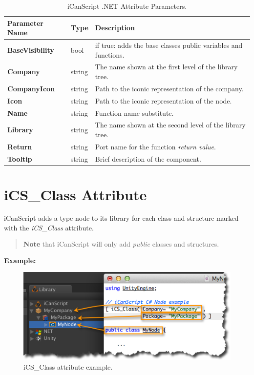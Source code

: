 \begin{table}[htbp]
\begin{minipage}{\linewidth}
\setlength{\tymax}{0.5\linewidth}
\centering
\small
\caption{iCanScript .NET Attribute Parameters.}
\label{icanscript.netattributeparameters.}
\begin{tabulary}{\textwidth}{@{}LLL@{}} \toprule
Parameter Name&Type&Description\\
\midrule
\textbf{BaseVisibility}&bool&if true: adds the base classes public variables and functions.\\
\textbf{Company}&string&The name shown at the first level of the library tree.\\
\textbf{CompanyIcon}&string&Path to the iconic representation of the company.\\
\textbf{Icon}&string&Path to the iconic representation of the node.\\
\textbf{Name}&string&Function name substitute.\\
\textbf{Library}&string&The name shown at the second level of the library tree.\\
\textbf{Return}&string&Port name for the function \emph{return value}.\\
\textbf{Tooltip}&string&Brief description of the component.\\

\bottomrule

\end{tabulary}
\end{minipage}
\end{table}

\section{iCS\_Class Attribute}
\label{ics_classattribute}

iCanScript adds a type node to its library for each class and structure marked with the \emph{iCS\_Class} attribute.

\begin{quote}

\textbf{Note} that iCanScript will only add \emph{public} classes and structures.
\end{quote}

\textbf{Example:}

\begin{figure}[htbp]
\centering
\includegraphics[keepaspectratio,width=\textwidth,height=0.75\textheight]{attribute-ics_class-example.png}
\caption{iCS\_Class attribute example.}
\label{attribute-ics_class-example.png}
\end{figure}

